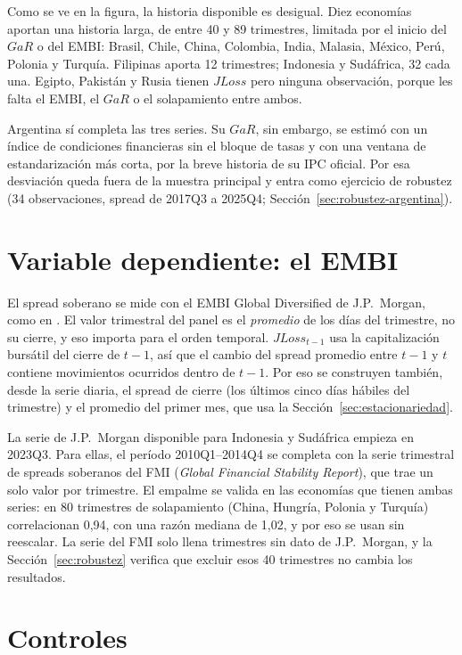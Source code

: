 Como se ve en la figura, la historia disponible es desigual. Diez economías aportan una historia larga, de entre 40 y 89 trimestres, limitada por el inicio del $GaR$ o del EMBI: Brasil, Chile, China, Colombia, India, Malasia, México, Perú, Polonia y Turquía. Filipinas aporta 12 trimestres; Indonesia y Sudáfrica, 32 cada una. Egipto, Pakistán y Rusia tienen $JLoss$ pero ninguna observación, porque les falta el EMBI, el $GaR$ o el solapamiento entre ambos.

Argentina sí completa las tres series. Su $GaR$, sin embargo, se estimó con un índice de condiciones financieras sin el bloque de tasas y con una ventana de estandarización más corta, por la breve historia de su IPC oficial. Por esa desviación queda fuera de la muestra principal y entra como ejercicio de robustez (34 observaciones, spread de 2017Q3 a 2025Q4; Sección~\ref{sec:robustez-argentina}).

\section{Variable dependiente: el EMBI}
\label{sec:embi}

El spread soberano se mide con el EMBI Global Diversified de J.P.\ Morgan, como en \citet{Chari2024b}. El valor trimestral del panel es el \emph{promedio} de los días del trimestre, no su cierre, y eso importa para el orden temporal. $JLoss_{t-1}$ usa la capitalización bursátil del cierre de $t-1$, así que el cambio del spread promedio entre $t-1$ y $t$ contiene movimientos ocurridos dentro de $t-1$. Por eso se construyen también, desde la serie diaria, el spread de cierre (los últimos cinco días hábiles del trimestre) y el promedio del primer mes, que usa la Sección~\ref{sec:estacionariedad}.

La serie de J.P.\ Morgan disponible para Indonesia y Sudáfrica empieza en 2023Q3. Para ellas, el período 2010Q1--2014Q4 se completa con la serie trimestral de spreads soberanos del FMI (\textit{Global Financial Stability Report}), que trae un solo valor por trimestre. El empalme se valida en las economías que tienen ambas series: en 80 trimestres de solapamiento (China, Hungría, Polonia y Turquía) correlacionan 0,94, con una razón mediana de 1,02, y por eso se usan sin reescalar. La serie del FMI solo llena trimestres sin dato de J.P.\ Morgan, y la Sección~\ref{sec:robustez} verifica que excluir esos 40 trimestres no cambia los resultados.

\section{Controles}
\label{sec:controles}

